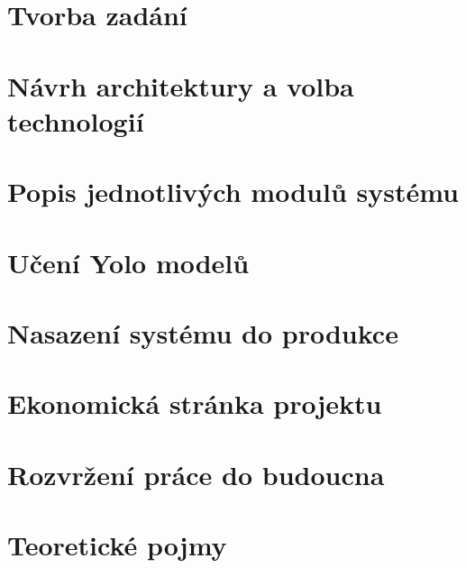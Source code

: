 \newpage
\chapter{Tvorba zadání}\label{ch:tvorba-zadani}
\textcolor{green}{}

\newpage
\chapter{Návrh architektury a volba technologií}\label{ch:navrh-architektury-a-volba-technologii}
\textcolor{green}{}

\newpage
\chapter{Popis jednotlivých modulů systému}\label{ch:popis-jednotlivych-modulu}
\textcolor{green}{}
\textcolor{green}{}
\textcolor{green}{}
\textcolor{green}{}
\textcolor{green}{}
\textcolor{green}{}
\textcolor{green}{}
\textcolor{green}{}
\textcolor{green}{}
\textcolor{green}{}
\textcolor{green}{}
\textcolor{green}{}
\textcolor{green}{}

\newpage
\chapter{Učení Yolo modelů}\label{ch:uceni_yolo_modelu}
\textcolor{green}{}
\newpage
\textcolor{green}{}

\newpage
\chapter{Nasazení systému do produkce}\label{ch:nasazeni-systemu-do-produkce}
\textcolor{green}{}

\newpage
\chapter{Ekonomická stránka projektu}\label{ch:ekonomicka-stranka-projektu}
\textcolor{green}{}

\newpage
\chapter{Rozvržení práce do budoucna}\label{ch:rozvrzeni-prace-do-budoucna}
\textcolor{green}{}

\newpage
\chapter{Teoretické pojmy}\label{ch:teoreticke-pojmy}
\textcolor{green}{}






